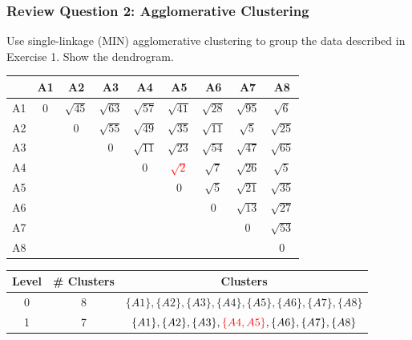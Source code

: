 \documentclass[aspectratio=169, 10pt]{beamer}
\begin{document}
\begin{frame}[t]
    \frametitle{Review Question 2: Agglomerative Clustering}
    \small
    Use single-linkage (MIN) agglomerative clustering to group the data described in Exercise 1. Show the dendrogram.
    \begin{table}[]
        \scriptsize
        \begin{tabular}{c|cccc|c|ccc}
           & A1 & A2 & A3 & A4 & A5 & A6 & A7 & A8 \\ \hline
        A1 & $0$  & $\sqrt{45}$ & $\sqrt{63}$ & $\sqrt{57}$ & $\sqrt{41}$ & $\sqrt{28}$ & $\sqrt{95}$ & $\sqrt{6}$ \\
        A2 &    & $0$  & $\sqrt{55}$ & $\sqrt{49}$ & $\sqrt{35}$ & $\sqrt{11}$ & $\sqrt{5}$  & $\sqrt{25}$ \\
        A3 &    &    & $0$  & $\sqrt{11}$ & $\sqrt{23}$ & $\sqrt{54}$ & $\sqrt{47}$ & $\sqrt{65}$ \\ \hline
        A4 &    &    &    & $0$  & \textcolor{red}{$\sqrt{2}$} & $\sqrt{7}$  & $\sqrt{26}$ & $\sqrt{5}$  \\ \hline
        A5 &    &    &    &    & $0$  & $\sqrt{5}$  & $\sqrt{21}$ & $\sqrt{35}$ \\
        A6 &    &    &    &    &    & $0$  & $\sqrt{13}$ & $\sqrt{27}$ \\
        A7 &    &    &    &    &    &    & $0$  & $\sqrt{53}$ \\
        A8 &    &    &    &    &    &    &    & $0$ \\
        \end{tabular}
    \end{table}

    \begin{table}[]
        \scriptsize
        \begin{tabular}{c|c|c}
        Level & \# Clusters & Clusters \\ \hline
        0     & 8           & $\{A1\}, \{A2\}, \{A3\}, \{A4\}, \{A5\}, \{A6\}, \{A7\}, \{A8\}$\\
        1     & 7           & $\{A1\}, \{A2\}, \{A3\}, \textcolor{red}{\{A4, A5\}}, \{A6\}, \{A7\}, \{A8\}$\\
        \end{tabular}
    \end{table}

\end{frame}
\end{document}
